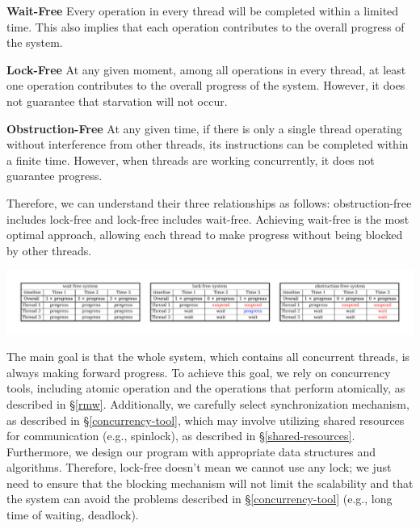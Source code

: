 \documentclass[fontsize=10pt, oneside]{scrartcl}
\newcommand{\secref}[1]{\hyperref[#1]{\textsc{\S}\ref*{#1}}}
\begin{document}
\textbf{Wait-Free} Every operation in every thread will be completed within a limited time. 
This also implies that each operation contributes to the overall progress of the system.

\textbf{Lock-Free} At any given moment, among all operations in every thread, 
at least one operation contributes to the overall progress of the system. 
However, it does not guarantee that starvation will not occur.

\textbf{Obstruction-Free} At any given time, if there is only a single thread operating without interference from other threads, 
its instructions can be completed within a finite time. However, when threads are working concurrently, 
it does not guarantee progress.

Therefore, we can understand their three relationships as follows:
obstruction-free includes lock-free and lock-free includes wait-free.
Achieving wait-free is the most optimal approach, 
allowing each thread to make progress without being blocked by other threads.

\includegraphics[keepaspectratio, width=1 \linewidth]{images/progress-type}
\label{fig:progress-type}

The main goal is that the whole system, 
which contains all concurrent threads, 
is always making forward progress. 
To achieve this goal, we rely on concurrency tools, 
including atomic operation and the operations that perform atomically, as described in \secref{rmw}. 
Additionally, we carefully select synchronization mechanism, as described in \secref{concurrency-tool}, 
which may involve utilizing shared resources for communication (e.g., spinlock), as described in \secref{shared-resources}. 
Furthermore, we design our program with appropriate data structures and algorithms. 
Therefore, lock-free doesn't mean we cannot use any lock; 
we just need to ensure that the blocking mechanism will not limit the scalability and that the system can avoid the problems described in \secref{concurrency-tool} (e.g., long time of waiting, deadlock).
\end{document}
